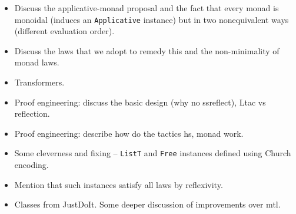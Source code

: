 \documentclass[declaration,inz,english,shortabstract]{iithesis}
\newcommand{\m}[1]{\texttt{#1}}
\begin{document}




\begin{itemize}
    \item Discuss the applicative-monad proposal and the fact that every monad is monoidal (induces an \m{Applicative} instance) but in two nonequivalent ways (different evaluation order).
    \item Discuss the laws that we adopt to remedy this and the non-minimality of monad laws.
    \item Transformers.
    \item Proof engineering: discuss the basic design (why no ssreflect), Ltac vs reflection.
    \item Proof engineering: describe how do the tactics hs, monad work.
    \item Some cleverness and fixing -- \m{ListT} and \m{Free} instances defined using Church encoding.
    \item Mention that such instances satisfy all laws by reflexivity.
    \item Classes from JustDoIt. Some deeper discussion of improvements over mtl.
\end{itemize}



\end{document}
